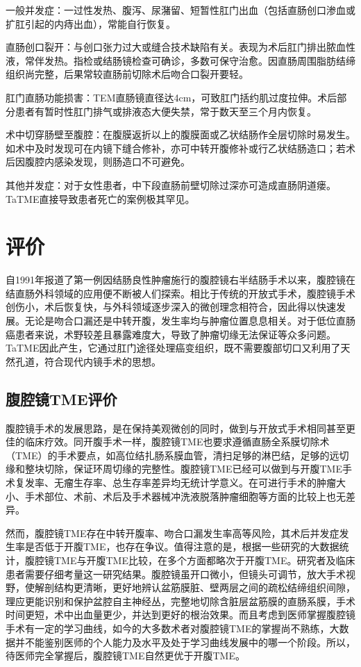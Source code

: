\documentclass[a4paper,11pt,onecolumn,twoside]{article}
\begin{document}
\begin{multicols}{2}
    \begin{compactenum}
        \item 一般并发症：一过性发热、腹泻、尿潴留、短暂性肛门出血（包括直肠创口渗血或扩肛引起的内痔出血），常能自行恢复。
        \item 直肠创口裂开：与创口张力过大或缝合技术缺陷有关。表现为术后肛门排出脓血性液，常伴发热。指检或结肠镜检查可确诊，多数可保守治愈。因直肠周围脂肪结缔组织尚完整，后果常较直肠前切除术后吻合口裂开要轻。
        \item 肛门直肠功能损害：TEM直肠镜直径达4cm，可致肛门括约肌过度拉伸。术后部分患者有暂时性肛门排气或排液态大便失禁，常于数天至三个月内恢复。
        \item 术中切穿肠壁至腹腔：在腹膜返折以上的腹膜面或乙状结肠作全层切除时易发生。如术中及时发现可在内镜下缝合修补，亦可中转开腹修补或行乙状结肠造口；若术后因腹腔内感染发现，则肠造口不可避免\supercite{14}。
        \item 其他并发症：对于女性患者，中下段直肠前壁切除过深亦可造成直肠阴道瘘。TaTME直接导致患者死亡的案例极其罕见\supercite{15}。
    \end{compactenum}

    \section{评价}
    自1991年报道了第一例因结肠良性肿瘤施行的腹腔镜右半结肠手术以来，腹腔镜在结直肠外科领域的应用便不断被人们探索。相比于传统的开放式手术，腹腔镜手术创伤小，术后恢复快，与外科领域逐步深入的微创理念相符合，因此得以快速发展。\supercite{W1}无论是吻合口漏还是中转开腹，发生率均与肿瘤位置息息相关。对于低位直肠癌患者来说，术野较差且暴露难度大，导致了肿瘤切缘无法保证等众多问题。TaTME因此产生，它通过肛门途径处理癌变组织，既不需要腹部切口又利用了天然孔道，符合现代内镜手术的思想。

    \subsection{腹腔镜TME评价}
    腹腔镜手术的发展思路，是在保持美观微创的同时，做到与开放式手术相同甚至更佳的临床疗效。同开腹手术一样，腹腔镜TME也要求遵循直肠全系膜切除术（TME）的手术要点，如高位结扎肠系膜血管，清扫足够的淋巴结，足够的远切缘和整块切除，保证环周切缘的完整性。\supercite{W4}腹腔镜TME已经可以做到与开腹TME手术复发率、无瘤生存率、总生存率差异均无统计学意义\supercite{W5}。在可进行手术的肿瘤大小、手术部位、术前、术后及手术器械冲洗液脱落肿瘤细胞等方面的比较上也无差异\supercite{16}。

    然而，腹腔镜TME存在中转开腹率、吻合口漏发生率高等风险，其术后并发症发生率是否低于开腹TME，也存在争议。值得注意的是，根据一些研究的大数据统计，腹腔镜TME与开腹TME比较，在多个方面都略次于开腹TME\supercite{17}。研究者及临床患者需要仔细考量这一研究结果。腹腔镜虽开口微小，但镜头可调节，放大手术视野，使解剖结构更清晰，更好地辨认盆筋膜脏、壁两层之间的疏松结缔组织间隙，理应更能识别和保护盆腔自主神经丛，完整地切除含脏层盆筋膜的直肠系膜，手术时间更短，术中出血量更少，并达到更好的根治效果。而且考虑到医师掌握腹腔镜手术有一定的学习曲线，如今的大多数术者对腹腔镜TME的掌握尚不熟练，大数据并不能鉴别医师的个人能力及水平及处于学习曲线发展中的哪一个阶段。所以，待医师完全掌握后，腹腔镜TME自然更优于开腹TME。


\end{multicols}
\end{document}
